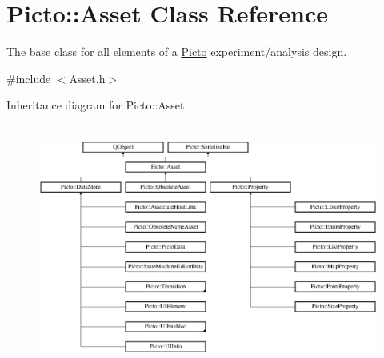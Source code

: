\hypertarget{class_picto_1_1_asset}{\section{Picto\-:\-:Asset Class Reference}
\label{class_picto_1_1_asset}
}


The base class for all elements of a \hyperlink{namespace_picto}{Picto} experiment/analysis design.  




{\ttfamily \#include $<$Asset.\-h$>$}

Inheritance diagram for Picto\-:\-:Asset\-:\begin{figure}[H]
\begin{center}
\leavevmode
\includegraphics[height=8.105263cm]{class_picto_1_1_asset}
\end{center}
\end{figure}
